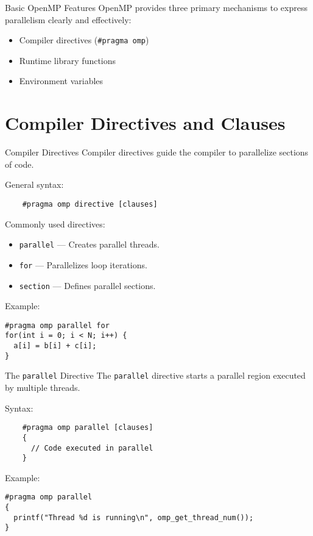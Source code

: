 \documentclass{beamer}
\begin{document}
\begin{frame}{Basic OpenMP Features}
  OpenMP provides three primary mechanisms to express parallelism clearly and effectively:

   \begin{itemize}
    \item Compiler directives (\texttt{\#pragma omp})
    \item Runtime library functions
    \item Environment variables
  \end{itemize}
\end{frame}

\section{Compiler Directives and Clauses}
\begin{frame}[fragile]{Compiler Directives}
  Compiler directives guide the compiler to parallelize sections of code.

  General syntax:
  \begin{verbatim}
    #pragma omp directive [clauses]
  \end{verbatim}

  Commonly used directives:
  \begin{itemize}
    \item \texttt{parallel} — Creates parallel threads.
    \item \texttt{for} — Parallelizes loop iterations.
    \item \texttt{section} — Defines parallel sections.
  \end{itemize}

  Example:
  \lstset{style=CStyle}
  \begin{lstlisting}
#pragma omp parallel for
for(int i = 0; i < N; i++) {
  a[i] = b[i] + c[i];
}
  \end{lstlisting}
\end{frame}

\begin{frame}[fragile]{The \texttt{parallel} Directive}
  The \texttt{parallel} directive starts a parallel region executed by multiple threads.

  Syntax:
  \begin{verbatim}
    #pragma omp parallel [clauses]
    {
      // Code executed in parallel
    }
  \end{verbatim}

  Example:
  \lstset{style=CStyle}
  \begin{lstlisting}
#pragma omp parallel
{
  printf("Thread %d is running\n", omp_get_thread_num());
}
  \end{lstlisting}
\end{frame}
\end{document}

